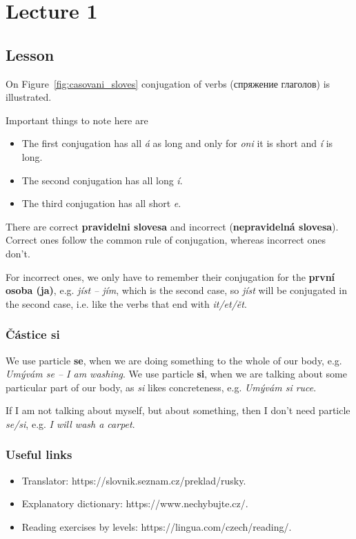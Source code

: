 \documentclass[12pt]{book}
\newcommand{\lecture}[1]{
    \renewcommand\chaptername{}
    \renewcommand\thechapter{}
    \chapter{Lecture #1}
    \renewcommand\thechapter{#1}
}
\begin{document}
\lecture{1}
\section{Lesson}
On Figure~\ref{fig:casovani_sloves} conjugation of verbs (\textrussian{спряжение глаголов}) is illustrated.

Important things to note here are
\begin{itemize}
    \item The first conjugation has all \emph{á} as long and only for \emph{oni} it is short 
        and \emph{í} is long.

    \item The second conjugation has all long \emph{í}.
    \item The third conjugation has all short \emph{e}.
\end{itemize}

There are correct \textbf{pravidelni slovesa} and incorrect (\textbf{nepravidelná slovesa}).
Correct ones follow the common rule of conjugation, whereas incorrect ones don't.

For incorrect ones, we only have to remember their conjugation for the \textbf{první osoba (ja)}, e.g. \emph{jíst -- jím},
which is the second case, so \emph{jíst} will be conjugated in the second case, i.e. like the verbs that end with \emph{it/et/ět}.

\subsection{Částice \textbf{si}}
We use particle \textbf{se}, when we are doing something to the whole of our body, e.g. \emph{Umývám se -- I am washing}.
We use particle \textbf{si}, when we are talking about some particular part of our body, as \emph{si} likes concreteness,
e.g. \emph{Umývám si ruce}.

If I am not talking about myself, but about something, then I don't need particle \emph{se/si}, e.g. \emph{I will wash a carpet}.

\subsection{Useful links}
\begin{itemize}
    \item Translator: https://slovnik.seznam.cz/preklad/rusky.
    \item Explanatory dictionary: https://www.nechybujte.cz/.
    \item Reading exercises by levels: https://lingua.com/czech/reading/.
\end{itemize}
\end{document}
